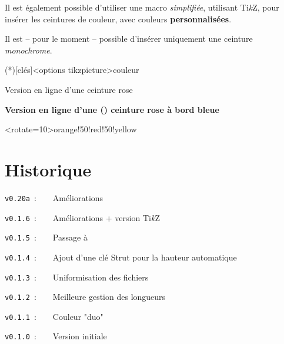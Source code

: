 \documentclass[french,11pt,a4paper]{article}
\providecommand\tikzlogo{Ti\textit{k}Z}
\let\TikZ\tikzlogo
\begin{document}
Il est également possible d'utiliser une macro \textit{simplifiée}, utilisant \TikZ, pour insérer les ceintures de couleur, avec couleurs \textbf{personnalisées}.

Il est -- pour le moment -- possible d'insérer uniquement une ceinture \textit{monochrome}.

\begin{codehigh}[language=latex/latex2,style/main=cyan!10,style/code=cyan!10]
\tkzcoloredbelt(*)[clés]<options tikzpicture>{couleur}

\end{codehigh}

\begin{demohigh}[language=latex/latex3,style/main=cyan!10,style/code=cyan!10,style/demo=cyan!10]
Version en ligne d'une  ceinture rose
\end{demohigh}

\begin{demohigh}[language=latex/latex3,style/main=cyan!10,style/code=cyan!10,style/demo=cyan!10]
\LARGE\sffamily\bfseries
Version en ligne d'une () ceinture rose à bord bleue
\end{demohigh}

\begin{demohigh}[language=latex/latex3,style/main=cyan!10,style/code=cyan!10,style/demo=cyan!10]
\tkzcoloredbelt*[height=2cm]<rotate=10>{orange!50!red!50!yellow}
\end{demohigh}

\pagebreak

\vfill

\section{Historique}

\verb|v0.20a|~:~~~~Améliorations 

\verb|v0.1.6|~:~~~~Améliorations + version \TikZ

\verb|v0.1.5|~:~~~~Passage à 

\verb|v0.1.4|~:~~~~Ajout d'une clé \textsf{Strut} pour la hauteur automatique

\verb|v0.1.3|~:~~~~Uniformisation des fichiers

\verb|v0.1.2|~:~~~~Meilleure gestion des longueurs

\verb|v0.1.1|~:~~~~Couleur "duo"

\verb|v0.1.0|~:~~~~Version initiale

\vspace*{15mm}
\end{document}
